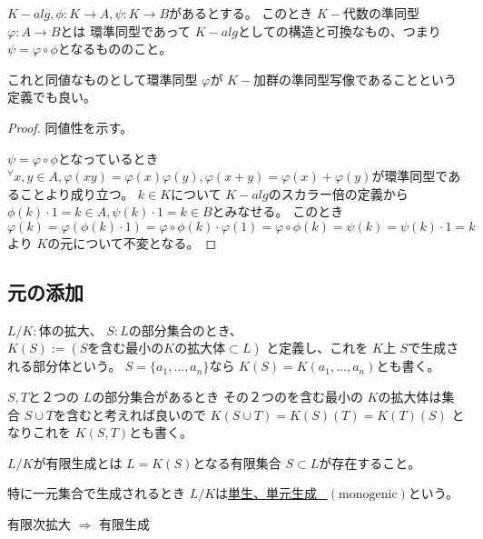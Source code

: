 \documentclass[../master_galois_theory]{subfiles}
\begin{document}
\begin{defi}
  $K-alg , \phi : K \longrightarrow A , \psi : K \longrightarrow B$があるとする。
  このとき $K-$代数の準同型 $\varphi : A \longrightarrow B$とは
  環準同型であって $K-alg$としての構造と可換なもの、つまり $\psi = \varphi \circ \phi$となるもののこと。

  これと同値なものとして環準同型 $\varphi$が $K-$加群の準同型写像であることという定義でも良い。
\end{defi}

\begin{proof}
  同値性を示す。

  $\psi = \varphi \circ \phi$となっているとき
  ${}^\forall x , y \in A , \varphi(xy) = \varphi(x) \varphi(y) , \varphi(x + y) = \varphi(x) + \varphi(y)$が環準同型であることより成り立つ。
  $k \in K$について $K-alg$のスカラー倍の定義から $\phi(k) \cdot 1 = k \in A , \psi(k) \cdot 1 = k \in B$とみなせる。
  このとき $\varphi(k) = \varphi(\phi(k) \cdot 1) = \varphi \circ \phi(k) \cdot \varphi(1) = \varphi \circ \phi(k) = \psi(k) = \psi(k) \cdot 1 = k$より $K$の元について不変となる。

\end{proof}

\subsection{元の添加}

\begin{defi}
  $L/K:$体の拡大、 $S:L$の部分集合のとき、
  $K(S) := (Sを含む最小のKの拡大体 \subset L)$
  と定義し、これを $K$上 $S$で生成される部分体という。
  $S = \{ a_1 , \dots , a_n\}$なら
  $K(S) = K(a_1 , \dots , a_n)$とも書く。

  $S,T$と２つの $L$の部分集合があるとき
  その２つのを含む最小の $K$の拡大体は集合 $S \cup T$を含むと考えれば良いので
  $K(S \cup T) = K(S)(T) = K(T)(S)$
  となりこれを $K(S,T)$とも書く。
\end{defi}

\begin{defi}
  $L/K$が有限生成とは $L = K(S)$となる有限集合 $S \subset L$が存在すること。

  特に一元集合で生成されるとき $L/K$は\underline{単生、単元生成 \  $(\mathrm{monogenic})$}という。
\end{defi}

\begin{rem}
  有限次拡大 $\Rightarrow$ 有限生成
\end{rem}
\end{document}
